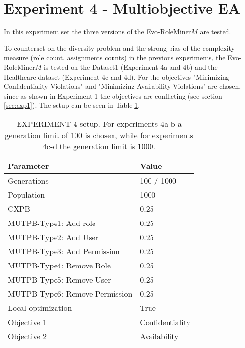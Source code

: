 \newpage
\section{Experiment 4 - Multiobjective EA}
\label{sec:exp4}
In this experiment set the three versions of the Evo-RoleMiner$M$ are tested.

To counteract on the diversity problem and the strong bias of the complexity measure (role count, assignments counts) in the previous experiments, the Evo-RoleMiner$M$ is tested on the Dataset1 (Experiment 4a and 4b) and the Healthcare dataset (Experiment 4c and 4d). For the objectives "Minimizing Confidentiality Violations" and "Minimizing Availability Violations" are chosen, since as shown in Experiment 1 the objectives are conflicting (see section \ref{sec:exp1}). The setup can be seen in Table \ref{tab:exp4_setup}.

\begin{table}[H]
	\centering
	\begin{adjustbox}{width=0.5\textwidth}
		\begin{tabular}{|l|l|}
			\hline
			\rowcolor{myGray} 
			\textbf{Parameter}              & \textbf{Value}    \\ \hline
			Generations                     & 100 / 1000       	\\ \hline
			Population                      & 1000        		\\ \hline
			CXPB                            & 0.25              \\ \hline
			MUTPB-Type1: Add role           & 0.25              \\ \hline
			MUTPB-Type2: Add User           & 0.25              \\ \hline
			MUTPB-Type3: Add Permission     & 0.25              \\ \hline
			MUTPB-Type4: Remove Role        & 0.25              \\ \hline
			MUTPB-Type5: Remove User        & 0.25              \\ \hline
			MUTPB-Type6: Remove Permission  & 0.25              \\ \hline
			Local optimization              & True        		\\ \hline
			Objective 1					    & Confidentiality   \\ \hline
			Objective 2					    & Availability     	\\ \hline
		\end{tabular}
	\end{adjustbox}
	\caption{EXPERIMENT 4 setup. For experiments 4a-b a generation limit of 100 is chosen, while for experiments 4c-d the generation limit is 1000.}
	\label{tab:exp4_setup}
\end{table}


